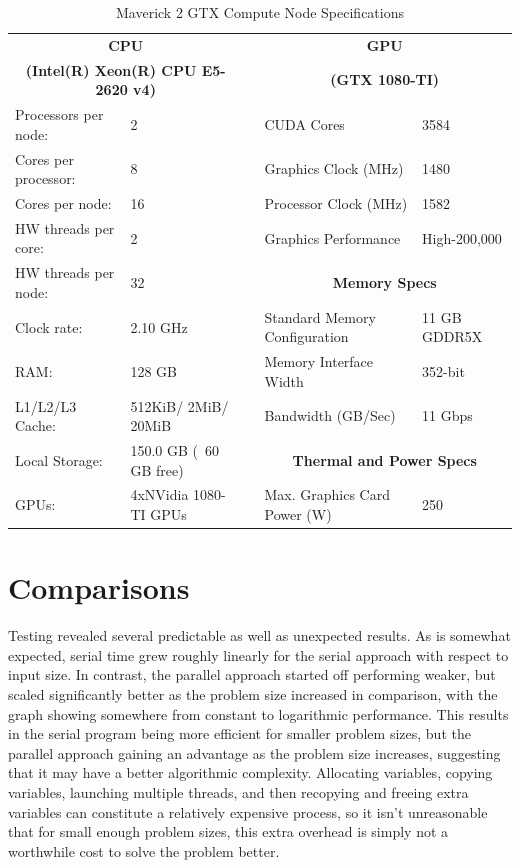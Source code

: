 \documentclass{article}
\begin{document}
\begin{table}[ht]
\centering
\caption{Maverick 2 GTX Compute Node Specifications} %
\label{table:nonlin} %
\begin{tabular}{ |p{}|p{}|p{}|p{}|p{}|} 
 \hline
 \multicolumn{2}{|c|}{\textbf{CPU}} &  & \multicolumn{2}{|c|}{\textbf{GPU}}\\
 \multicolumn{2}{|c|}{\footnotesize\textbf{(Intel(R) Xeon(R) CPU E5-2620 v4)}} &  & \multicolumn{2}{|c|}{\textbf{(GTX 1080-TI)}}\\
 \hline
 {Processors per node:} & {2} &  & {CUDA Cores} & {3584}\\
 \hline
 {Cores per processor:} & {8} &  & {Graphics Clock (MHz)} & {1480}\\
 \hline
 {Cores per node:} & {16} &  & {Processor Clock (MHz)} & {1582}\\
 \hline
 {HW threads per core:} & {2} &  & {Graphics Performance} & {High-200,000}\\
 \hline
 {HW threads per node:} & {32} &  & \multicolumn{2}{|c|}{\textbf{Memory Specs}}\\
 \hline
 {Clock rate:} & {2.10 GHz} &  & {Standard Memory Configuration} & {11 GB GDDR5X}\\
 \hline
 {RAM:} & {128 GB} &  & {Memory Interface Width} & {352-bit}\\
 \hline
 {L1/L2/L3 Cache:} & {512KiB/ 2MiB/ 20MiB} &  & {Bandwidth (GB/Sec)} & {11 Gbps}\\
 \hline
 {Local Storage:} & {150.0 GB (~60 GB free)} &  & \multicolumn{2}{|c|}{\textbf{Thermal and Power Specs}}\\
 \hline
 {GPUs:} & {4xNVidia 1080-TI GPUs} &  & {Max. Graphics Card Power (W)} & {250}\\
 \hline
\end{tabular}
\end{table}

\section{Comparisons}
Testing revealed several predictable as well as unexpected results. As is somewhat expected, serial time grew roughly linearly for the serial approach with respect to input size. In contrast, the parallel approach started off performing weaker, but scaled significantly better as the problem size increased in comparison, with the graph showing somewhere from constant to logarithmic performance. This results in the serial program being more efficient for smaller problem sizes, but the parallel approach gaining an advantage as the problem size increases, suggesting that it may have a better algorithmic complexity.  Allocating variables, copying variables, launching multiple threads, and then recopying and freeing extra variables can constitute a relatively expensive process, so it isn’t unreasonable that for small enough problem sizes, this extra overhead is simply not a worthwhile cost to solve the problem better. 
\end{document}
